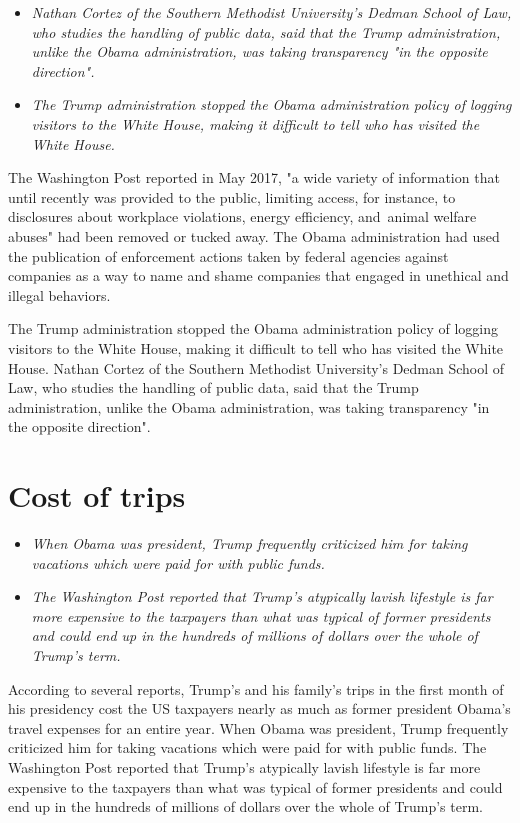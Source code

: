 \begin{itemize}
\item
  \emph{Nathan Cortez of the Southern Methodist University's Dedman
  School of Law, who studies the handling of public data, said that the
  Trump administration, unlike the Obama administration, was taking
  transparency "in the opposite direction".}
\item
  \emph{The Trump administration stopped the Obama administration policy
  of logging visitors to the White House, making it difficult to tell
  who has visited the White House.}
\end{itemize}

The Washington Post reported in May 2017, "a wide variety of information
that until recently was provided to the public, limiting access, for
instance, to disclosures about workplace violations, energy efficiency,
and~animal welfare abuses" had been removed or tucked away. The Obama
administration had used the publication of enforcement actions taken by
federal agencies against companies as a way to name and shame companies
that engaged in unethical and illegal behaviors.

The Trump administration stopped the Obama administration policy of
logging visitors to the White House, making it difficult to tell who has
visited the White House. Nathan Cortez of the Southern Methodist
University's Dedman School of Law, who studies the handling of public
data, said that the Trump administration, unlike the Obama
administration, was taking transparency "in the opposite direction".

\section{Cost of trips}\label{cost-of-trips}

\begin{itemize}
\item
  \emph{When Obama was president, Trump frequently criticized him for
  taking vacations which were paid for with public funds.}
\item
  \emph{The Washington Post reported that Trump's atypically lavish
  lifestyle is far more expensive to the taxpayers than what was typical
  of former presidents and could end up in the hundreds of millions of
  dollars over the whole of Trump's term.}
\end{itemize}

According to several reports, Trump's and his family's trips in the
first month of his presidency cost the US taxpayers nearly as much as
former president Obama's travel expenses for an entire year. When Obama
was president, Trump frequently criticized him for taking vacations
which were paid for with public funds. The Washington Post reported that
Trump's atypically lavish lifestyle is far more expensive to the
taxpayers than what was typical of former presidents and could end up in
the hundreds of millions of dollars over the whole of Trump's term.

